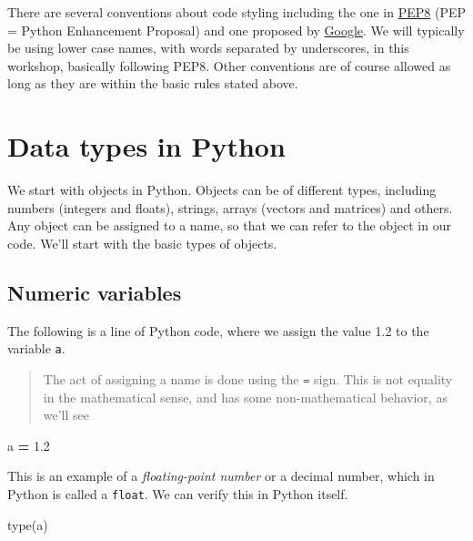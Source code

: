 \documentclass[
  letterpaper,
]{scrbook}
\newenvironment{Shaded}{\begin{snugshade}}{\end{snugshade}}
\newcommand{\BuiltInTok}[1]{#1}
\newcommand{\FloatTok}[1]{\textcolor[rgb]{0.00,0.00,0.81}{#1}}
\newcommand{\NormalTok}[1]{#1}
\newcommand{\OperatorTok}[1]{\textcolor[rgb]{0.81,0.36,0.00}{\textbf{#1}}}
\begin{document}
There are several conventions about code styling including the one in \href{https://www.python.org/dev/peps/pep-0008/\#function-and-variable-names}{PEP8} (PEP = Python Enhancement Proposal) and one proposed by \href{https://google.github.io/styleguide/pyguide.html\#316-naming}{Google}. We will typically be using lower case names, with words separated by underscores, in this workshop, basically following PEP8. Other conventions are of course allowed as long as they are within the basic rules stated above.

\hypertarget{data-types-in-python}{%
\section{Data types in Python}\label{data-types-in-python}}

We start with objects in Python. Objects can be of different types, including numbers (integers and floats), strings, arrays (vectors and matrices) and others. Any object can be assigned to a name, so that we can refer to the object in our code. We'll start with the basic types of objects.

\hypertarget{numeric-variables}{%
\subsection{Numeric variables}\label{numeric-variables}}

The following is a line of Python code, where we assign the value 1.2 to the variable \texttt{a}.

\begin{quote}
The act of assigning a name is done using the \texttt{=} sign. This is not equality in the mathematical sense, and has some non-mathematical behavior, as we'll see
\end{quote}

\begin{Shaded}
\begin{Highlighting}[]
\NormalTok{a }\OperatorTok{=} \FloatTok{1.2}
\end{Highlighting}
\end{Shaded}

This is an example of a \emph{floating-point number} or a decimal number, which in Python is called a \texttt{float}. We can verify this in Python itself.

\begin{Shaded}
\begin{Highlighting}[]
\BuiltInTok{type}\NormalTok{(a)}
\end{Highlighting}
\end{Shaded}
\end{document}
